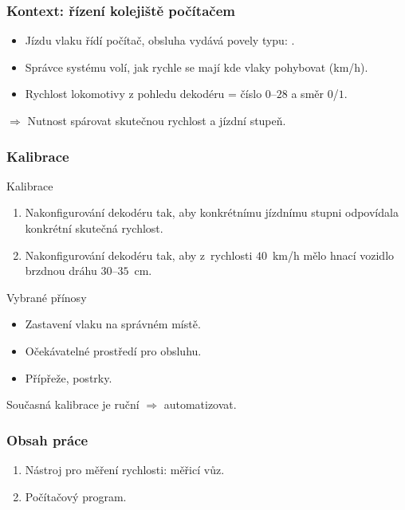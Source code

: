 \documentclass[aspectratio=169]{beamer}
\begin{document}

\begin{frame}
\frametitle{Kontext: řízení kolejiště počítačem}
\begin{itemize}
\item Jízdu vlaku řídí počítač, obsluha vydává povely typu: .
\item Správce systému volí, jak rychle se mají kde vlaky pohybovat (km/h).
\item Rychlost lokomotivy z pohledu dekodéru = číslo $0$--$28$ a směr $0$/$1$.
\end{itemize}
$\Rightarrow$ Nutnost spárovat skutečnou rychlost a jízdní stupeň.
\end{frame}


\begin{frame}
\frametitle{Kalibrace}
\begin{block}{Kalibrace}
\begin{enumerate}
\item Nakonfigurování dekodéru tak, aby konkrétnímu jízdnímu stupni odpovídala
konkrétní skutečná rychlost.
\item Nakonfigurování dekodéru tak, aby z~rychlosti $40$~km/h mělo hnací vozidlo
brzdnou dráhu $30$--$35$~cm.
\end{enumerate}
\end{block}

\begin{block}{Vybrané přínosy}
\begin{itemize}
\item Zastavení vlaku na správném místě.
\item Očekávatelné prostředí pro obsluhu.
\item Přípřeže, postrky.
\end{itemize}
\end{block}

Současná kalibrace je ruční $\Rightarrow$ automatizovat.
\end{frame}


\begin{frame}
\frametitle{Obsah práce}
\begin{enumerate}
\item Nástroj pro měření rychlosti: měřicí vůz.
\item Počítačový program.
\end{enumerate}
\end{frame}
\end{document}
